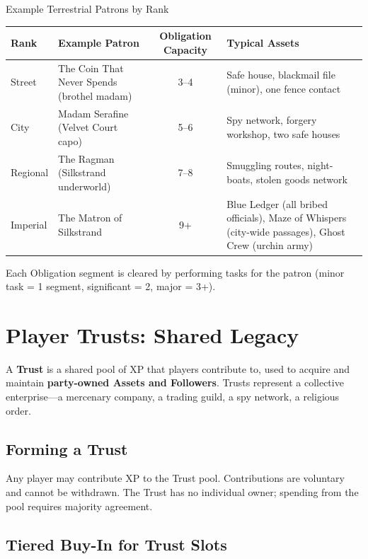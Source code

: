 \begin{gmtable}{Example Terrestrial Patrons by Rank}
\centering
\small
\setlength{\tabcolsep}{4pt}
\renewcommand{\arraystretch}{1.15}
\begin{tabularx}{\textwidth}{@{}
  l
  >{\raggedright\arraybackslash}X
  c
  >{\raggedright\arraybackslash}X@{}}
\toprule
\textbf{Rank} & \textbf{Example Patron} & \textbf{Obligation Capacity} & \textbf{Typical Assets} \\
\midrule
Street & The Coin That Never Spends (brothel madam) & 3--4 & Safe house, blackmail file (minor), one fence contact \\
City   & Madam Serafine (Velvet Court capo)            & 5--6 & Spy network, forgery workshop, two safe houses \\
Regional & The Ragman (Silkstrand underworld)         & 7--8 & Smuggling routes, night-boats, stolen goods network \\
Imperial & The Matron of Silkstrand                   & 9+  & Blue Ledger (all bribed officials), Maze of Whispers (city-wide passages), Ghost Crew (urchin army) \\
\bottomrule
\end{tabularx}
\tcblower
\small Each Obligation segment is cleared by performing tasks for the patron (minor task = 1 segment, significant = 2, major = 3+).
\end{gmtable}


\section{Player Trusts: Shared Legacy}
\label{sec:trusts-gm}

A \textbf{Trust} is a shared pool of XP that players contribute to, used to acquire and maintain \textbf{party-owned Assets and Followers}. Trusts represent a collective enterprise---a mercenary company, a trading guild, a spy network, a religious order.

\subsection{Forming a Trust}

Any player may contribute XP to the Trust pool. Contributions are voluntary and cannot be withdrawn. The Trust has no individual owner; spending from the pool requires majority agreement.

\subsection{Tiered Buy-In for Trust Slots}

